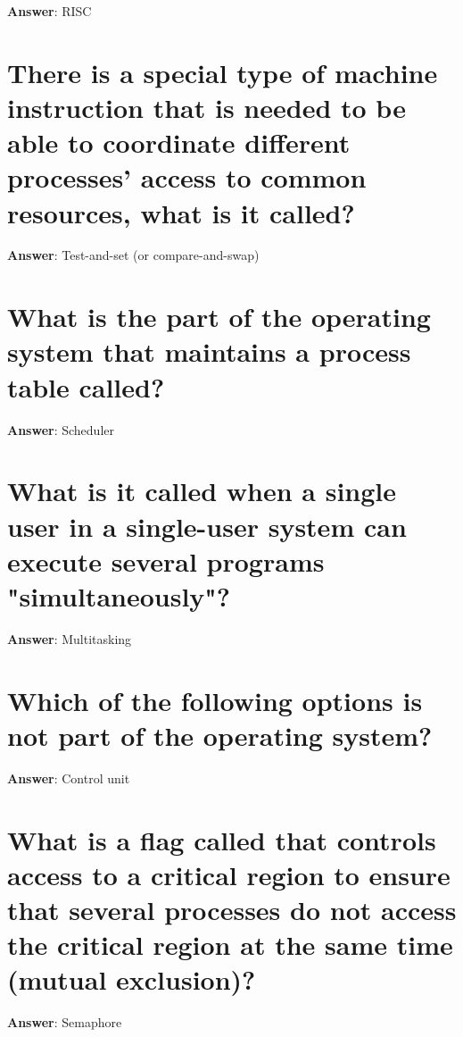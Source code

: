 \documentclass[a4paper,11pt,oneside]{book}
\begin{document}
\begin{sloppypar}
\label{q:6:sa:en:True}

\textbf{Answer}: RISC



\section{There is a special type of machine instruction that is needed to be able to coordinate different processes' access to common resources, what is it called?}

\label{q:7:sa:en:True}

\textbf{Answer}: Test-and-set (or compare-and-swap)



\section{What is the part of the operating system that maintains a process table called?}

\label{q:8:sa:en:True}

\textbf{Answer}: Scheduler



\section{What is it called when a single user in a single-user system can execute several programs "simultaneously"?}

\label{q:10:sa:en:True}

\textbf{Answer}: Multitasking



\section{Which of the following options is not part of the operating system?}

\label{q:11:sa:en:True}

\textbf{Answer}: Control unit



\section{What is a flag called that controls access to a critical region to ensure that several processes do not access the critical region at the same time (mutual exclusion)?}

\label{q:12:sa:en:True}

\textbf{Answer}: Semaphore




\end{sloppypar}
\end{document}
